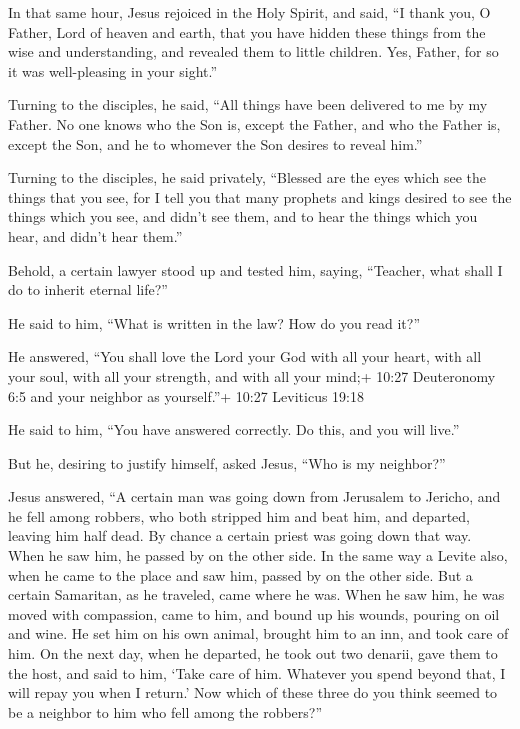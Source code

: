  In that same hour, Jesus rejoiced in the Holy Spirit, and
said, ``I thank you, O Father, Lord of heaven and earth, that you have
hidden these things from the wise and understanding, and revealed them
to little children. Yes, Father, for so it was well-pleasing in your
sight.''

 Turning to the disciples, he said, ``All things have been
delivered to me by my Father. No one knows who the Son is, except the
Father, and who the Father is, except the Son, and he to whomever the
Son desires to reveal him.''

 Turning to the disciples, he said privately, ``Blessed are
the eyes which see the things that you see,  for I tell you
that many prophets and kings desired to see the things which you see,
and didn't see them, and to hear the things which you hear, and didn't
hear them.''

 Behold, a certain lawyer stood up and tested him, saying,
``Teacher, what shall I do to inherit eternal life?''

 He said to him, ``What is written in the law? How do you
read it?''

 He answered, ``You shall love the Lord your God with all
your heart, with all your soul, with all your strength, and with all
your mind;+ 10:27 Deuteronomy 6:5 and your neighbor as yourself.''+
10:27 Leviticus 19:18

 He said to him, ``You have answered correctly. Do this,
and you will live.''

 But he, desiring to justify himself, asked Jesus, ``Who is
my neighbor?''

 Jesus answered, ``A certain man was going down from
Jerusalem to Jericho, and he fell among robbers, who both stripped him
and beat him, and departed, leaving him half dead.  By
chance a certain priest was going down that way. When he saw him, he
passed by on the other side.  In the same way a Levite
also, when he came to the place and saw him, passed by on the other
side.  But a certain Samaritan, as he traveled, came where
he was. When he saw him, he was moved with compassion, 
came to him, and bound up his wounds, pouring on oil and wine. He set
him on his own animal, brought him to an inn, and took care of him.
 On the next day, when he departed, he took out two
denarii, gave them to the host, and said to him, `Take care of him.
Whatever you spend beyond that, I will repay you when I return.'
 Now which of these three do you think seemed to be a
neighbor to him who fell among the robbers?''

